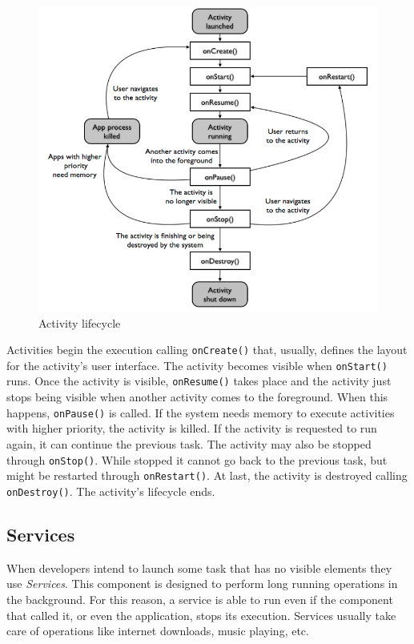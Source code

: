 \begin{figure}[h]
 \begin{center}
 \includegraphics[scale=0.5]{figures/activity_lifecycle.png}
 \end{center}
 \caption{Activity lifecycle}
 \label{fig:act_lifecycle}
\end{figure}

Activities begin the execution calling \texttt{onCreate()} that, usually, defines the layout for the activity's user interface. The activity becomes visible when \texttt{onStart()} runs. Once the activity is visible, \texttt{onResume()} takes place and the activity just stops being visible when another activity comes to the foreground. When this happens, \texttt{onPause()} is called. If the system needs memory to execute activities with higher priority, the activity is killed. If the activity is requested to run again, it can continue the previous task. The activity may also be stopped through \texttt{onStop()}. While stopped it cannot go back to the previous task, but might be restarted through \texttt{onRestart()}. At last, the activity is destroyed calling \texttt{onDestroy()}. The activity's lifecycle ends.

\subsection{Services}

When developers intend to launch some task that has no visible elements they use \textit{Services}. This component is designed to perform long running operations in the background. For this reason, a service is able to run even if the component that called it, or even the application, stops its execution. Services usually take care of operations like internet downloads, music playing, etc.

